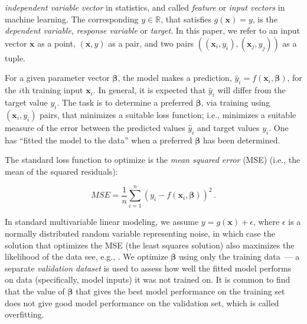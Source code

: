 \documentclass[conference]{IEEEtran}
\begin{document}
\textit{independent variable vector} in statistics, and called \textit{feature} or \textit{input vectors} in machine learning. The corresponding $y \in \mathbb{R}$, that satisfies $g(\mathbf{x})=y$, is the \textit{dependent variable}, \textit{response variable} or \textit{target}.
In this paper, we refer to an input vector $\mathbf{x}$ as a point, $(\mathbf{x},y)$ as a pair, and two pairs $((\mathbf{x}_i,y_i),(\mathbf{x}_j,y_j))$ as a tuple.


For a given parameter vector $\boldsymbol{\beta}$, the model makes a prediction, $\hat{y}_i = f(\mathbf{x}_i,\boldsymbol{\beta})$, for the $i$th training input $\mathbf{x}_i$.
In general, it is expected that $\hat{y}_i$ will differ from the target value $y_i$. The task is to determine a preferred $\boldsymbol{\beta}$, via training using $(\mathbf{x}_i,y_i)$ pairs, that minimizes a suitable loss function; i.e., minimizes a suitable measure of the error between the predicted values $\hat{y}_i$ and target values $y_i$. 
One has ``fitted the model to the data'' when a preferred $\boldsymbol \beta$ has been determined.

The standard loss function to optimize is the \emph{mean squared error} (MSE) (i.e., the mean of the squared residuals):

\begin{equation}
 MSE = \frac{1}{n}\sum_{i=1}^n (y_i - f(\mathbf{x}_i,\boldsymbol{\beta}))^2\,.
\end{equation}

In standard multivariable linear modeling, we assume $y = g(\mathbf{x}) + \epsilon $, where $\epsilon$ is a normally distributed random variable representing noise, in which case the solution that optimizes the MSE (the least squares solution) also maximizes the likelihood of the data see, e.g., \cite{hastie01statisticallearning}.
We optimize $\boldsymbol{\beta}$ using only the training data~--- a separate \emph{validation dataset} is used to assess how well the fitted model performs on data (specifically, model inputs) it was not trained on. 
It is common to find that the value of $\boldsymbol{\beta}$ that gives the best model performance on the training set does not give good model performance on the validation set, which is called overfitting. 
\end{document}
